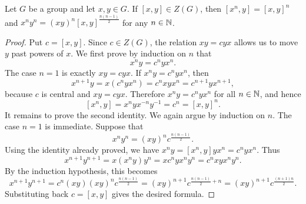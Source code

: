 \documentclass[../Odyssey_Project.tex]{subfiles}
\begin{document}
\begin{lemma}
\label{lem:8.9}
Let $G$ be a group and let $x, y \in G$. If $[x,y] \in Z(G)$, then $[x^n, y] = [x,y]^n$ and $x^n y^n = (xy)^n [x,y]^{\frac{n(n-1)}{2}}$ for any $n \in \mathbb{N}$.
\end{lemma}
\begin{proof}
Put $c=[x,y]$. Since $c\in Z(G)$, the relation $xy=cyx$ allows us to move $y$ past powers of $x$. We first prove by induction on $n$ that
\[
    x^n y=c^n yx^n.
\]
The case $n=1$ is exactly $xy=cyx$. If $x^n y=c^n yx^n$, then
\[
    x^{n+1}y=x(c^n yx^n)=c^n xyx^n=c^{n+1}yx^{n+1},
\]
because $c$ is central and $xy=cyx$. Therefore $x^n y=c^n yx^n$ for all $n\in \mathbb{N}$, and hence
\[
    [x^n,y]=x^n yx^{-n}y^{-1}=c^n=[x,y]^n.
\]
It remains to prove the second identity. We again argue by induction on $n$. The case $n=1$ is immediate. Suppose that
\[
    x^n y^n=(xy)^n c^{\frac{n(n-1)}{2}}.
\]
Using the identity already proved, we have $x^n y=[x^n,y]yx^n=c^n yx^n$. Thus
\[
    x^{n+1}y^{n+1}
    =x(x^n y)y^n
    =xc^n yx^n y^n
    =c^n xyx^n y^n.
\]
By the induction hypothesis, this becomes
\[
    x^{n+1}y^{n+1}
    =c^n(xy)(xy)^n c^{\frac{n(n-1)}{2}}
    =(xy)^{n+1}c^{\frac{n(n-1)}{2}+n}
    =(xy)^{n+1}c^{\frac{(n+1)n}{2}}.
\]
Substituting back $c=[x,y]$ gives the desired formula.
\end{proof}
\end{document}
